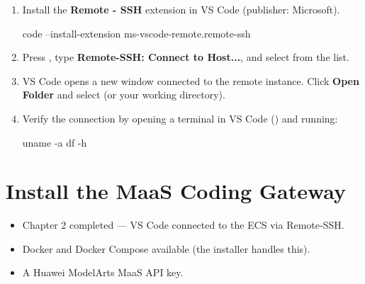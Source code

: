 \documentclass[english]{guide}
\begin{document}
\passoapasso
\begin{enumerate}
  \item Install the \textbf{Remote - SSH} extension in VS Code
        (publisher: Microsoft).

  \begin{codigo}[bash]
code --install-extension ms-vscode-remote.remote-ssh
  \end{codigo}

  \item Press , type \textbf{Remote-SSH: Connect to Host...}, and
        select  from the list.

  \item VS Code opens a new window connected to the remote instance. Click
        \textbf{Open Folder} and select  (or your working
        directory).

  \item Verify the connection by opening a terminal in VS Code
        () and running:

  \begin{codigo}[bash]
uname -a
df -h
  \end{codigo}
\end{enumerate}

\section{Install the MaaS Coding Gateway}

\begin{objetivos}

  \prerequisitos
  \begin{itemize}
    \item Chapter 2 completed — VS Code connected to the ECS via Remote-SSH.
    \item Docker and Docker Compose available (the installer handles this).
    \item A Huawei ModelArts MaaS API key.
  \end{itemize}
\end{objetivos}
\end{document}
